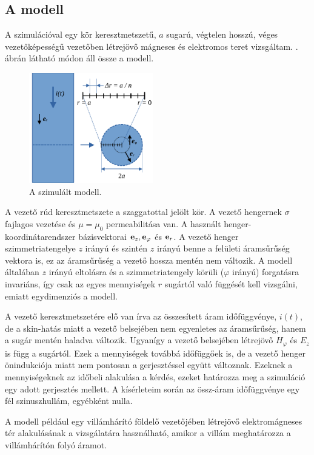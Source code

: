         \subsection{A modell}
            A szimulációval egy kör keresztmetszetű, $a$ sugarú, végtelen hosszú, véges vezetőképességű vezetőben létrejövő mágneses és elektromos teret vizsgáltam. . ábrán látható módon áll össze a modell. 
            \par
            \begin{figure}[h!]
                \centering
                \includegraphics[width=0.48\textwidth]{kep/modell.pdf}
                \caption{A szimulált modell.}
                \label{fig:modell}
            \end{figure}
             A vezető rúd keresztmetszete a szaggatottal jelölt kör. A vezető hengernek $\sigma$ fajlagos vezetése és $\mu=\mu_0$ permeabilitása van. A használt henger-koordinátarendszer bázisvektorai ${\bf e}_{z}, {\bf e}_{\varphi}$ és ${\bf e}_{r}$. A vezető henger szimmetriatengelye $z$ irányú és szintén $z$ irányú benne a felületi áramsűrűség vektora is, ez az áramsűrűség a vezető hossza mentén nem változik. A modell általában $z$ irányú eltolásra és a szimmetriatengely körüli ($\varphi$ irányú) forgatásra invariáns, így  csak az egyes mennyiségek $r$ sugártól való függését kell vizsgálni, emiatt egydimenziós a modell.
             \par
             A vezető keresztmetszetére elő van írva az összesített áram időfüggvénye, $i(t)$, de a skin-hatás miatt a vezető belsejében nem egyenletes az áramsűrűség, hanem a sugár mentén haladva változik. Ugyanígy a vezető belsejében létrejövő $H_\varphi$ és $E_z$ is függ a sugártól. Ezek a mennyiségek továbbá időfüggőek is, de a vezető henger önindukciója miatt nem pontosan a gerjesztéssel együtt változnak. Ezeknek a mennyiségeknek az időbeli alakulása a kérdés, ezeket határozza meg a szimuláció egy adott gerjesztés mellett. A kísérleteim során az össz-áram időfüggvénye egy fél szinuszhullám, egyébként nulla.
            \par
            A modell például egy villámhárító földelő vezetőjében létrejövő elektromágneses tér alakulásának a vizsgálatára használható, amikor a villám meghatározza a villámhárítón folyó áramot.
